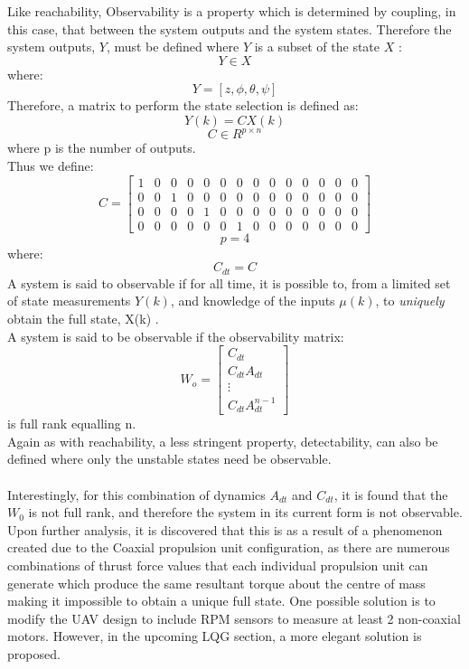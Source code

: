 \documentclass[12pt,a4paper,twoside]{report}
\begin{document}
				Like reachability, Observability is a property which is determined by coupling, in this case, that between the system outputs and the system states. Therefore the system outputs, $Y$, must be defined where $Y$ is a subset of the state $X$ :
				\[
					Y \in X
				\]
				where:
				\begin{equation}
					Y = [z,\phi,\theta,\psi]
				\end{equation}
				Therefore, a matrix to perform the state selection is defined as:
				\\
				\begin{equation}
					Y(k) = CX(k)  
				\end{equation}
				\[
					C \in R^{p \times n}  
				\]
				where p is the number of outputs.
				\\
				Thus we define:
				\setcounter{MaxMatrixCols}{15}
				\begin{equation}
					C =
					\begin{bmatrix}
						1&0&0&0&0&0&0&0&0&0&0&0&0&0 \\
						0&0&1&0&0&0&0&0&0&0&0&0&0&0 \\
						0&0&0&0&1&0&0&0&0&0&0&0&0&0 \\
						0&0&0&0&0&0&1&0&0&0&0&0&0&0
					\end{bmatrix}  
				\end{equation}
				\[
					p = 4  
				\]
				where:
				\[
					C_{dt} = C
				\]
				A system is said to observable if for all time, it is possible to, from a limited set of state measurements $Y(k)$, and knowledge of the inputs $\mu(k)$, to \emph{uniquely} obtain the full state, X(k) \cite{18}.
				\\
				A system is said to be observable if the observability matrix:
				\begin{equation}
					W_o = 
					\begin{bmatrix}
						C_{dt}\\
						C_{dt}A_{dt}\\ 
						\vdots \\
						C_{dt}A_{dt}^{n-1}
					\end{bmatrix}
				\end{equation}
				is full rank equalling n.
				\\
				Again as with reachability, a less stringent property, detectability, can also be defined where only the unstable states need be observable.
				\\ \\
				Interestingly, for this combination of dynamics $A_{dt}$ and $C_{dt}$, it is found that the $W_0$ is not full rank, and therefore the system in its current form is not observable. Upon further analysis, it is discovered that this is as a result of a phenomenon created due to the Coaxial propulsion unit configuration, as there are numerous combinations of thrust force values that each individual propulsion unit can generate which produce the same resultant torque about the centre of mass making it impossible to obtain a unique full state. One possible solution is to modify the UAV design to include RPM sensors to measure at least 2 non-coaxial motors. However, in the upcoming LQG section, a more elegant solution is proposed.
		
\end{document}
